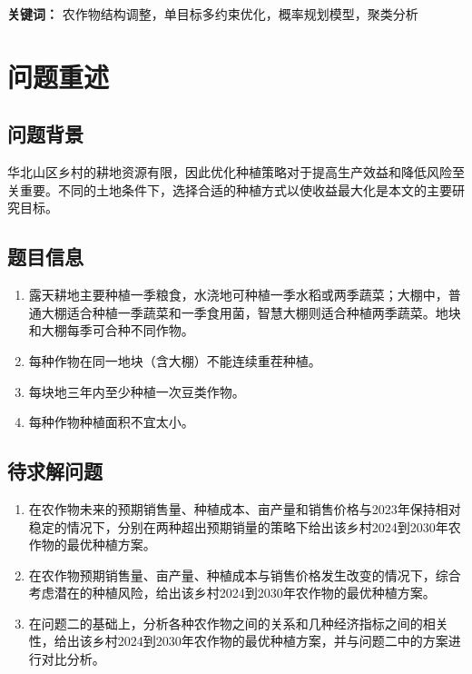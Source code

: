 \documentclass[12pt]{ctexart}
\begin{document}
	
	
	
	
	
	
	\vspace{0.5cm}  
	\noindent \textbf{关键词：}  农作物结构调整，单目标多约束优化，概率规划模型，聚类分析
	\newpage
	
	\section{问题重述}  
	\subsection{问题背景}  
	华北山区乡村的耕地资源有限，因此优化种植策略对于提高生产效益和降低风险至关重要。不同的土地条件下，选择合适的种植方式以使收益最大化是本文的主要研究目标。  
	
	\subsection{题目信息}  
	\begin{enumerate}  
		\item 露天耕地主要种植一季粮食，水浇地可种植一季水稻或两季蔬菜；大棚中，普通大棚适合种植一季蔬菜和一季食用菌，智慧大棚则适合种植两季蔬菜。地块和大棚每季可合种不同作物。  
		\item 每种作物在同一地块（含大棚）不能连续重茬种植。  
		\item 每块地三年内至少种植一次豆类作物。  
		\item 每种作物种植面积不宜太小。  
	\end{enumerate}  
	
	\subsection{待求解问题}  
	\begin{enumerate}  
		\item 在农作物未来的预期销售量、种植成本、亩产量和销售价格与2023年保持相对稳定的情况下，分别在两种超出预期销量的策略下给出该乡村2024到2030年农作物的最优种植方案。  
		\item 在农作物预期销售量、亩产量、种植成本与销售价格发生改变的情况下，综合考虑潜在的种植风险，给出该乡村2024到2030年农作物的最优种植方案。  
		\item 在问题二的基础上，分析各种农作物之间的关系和几种经济指标之间的相关性，给出该乡村2024到2030年农作物的最优种植方案，并与问题二中的方案进行对比分析。  
	\end{enumerate}  
	\newpage
\end{document}
